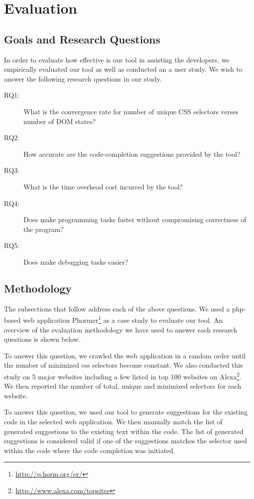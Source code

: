 \section{Evaluation}
\label{Sec:Evaluation}

	\subsection{Goals and Research Questions}
	\label{Sec:Goals}
	In order to evaluate how effective is our tool in assisting the developers, we empirically evaluated our tool as well as conducted an a user study. We wish to answer the following research questions in our study.
	\begin{description}
		\item[RQ1:] What is the convergence rate for number of unique CSS selectors verses number of DOM states?
		\item[RQ2:] How accurate are the code-completion suggestions provided by the tool?
		\item[RQ3:] What is the time overhead cost incurred by the tool?
		\item[RQ4:] Does \dompletion make programming tasks faster without compromising correctness of the program?
		\item[RQ5:] Does \dompletion make debugging tasks easier?
	\end{description}
	
	\subsection{Methodology}
	\label{Sec:Methodology}
	The subsections that follow address each of the above questions. We used a php-\javascript based web application Phormer\footnote{\url{http://p.horm.org/er/}} as a case study to evaluate our tool. An overview of the evaluation methodology we have used to answer each research questions is shown below.
	
	 To answer this question, we crawled the web application in a random order until the number of minimized css selectors become constant. We also conducted this study on 5 major websites including a few listed in top 100 websites on Alexa\footnote{\url{http://www.alexa.com/topsites}}.  We then reported the number of total, unique and minimized \css selectors for each website.
	
	 To answer this question, we used our tool to generate suggestions for the existing \javascript code in the selected web application. We then manually match the list of generated suggestions to the existing text within the \javascript code. The list of generated suggestions is considered valid if one of the suggestions matches the \css selector used within the code where the code completion was initiated. 
		
